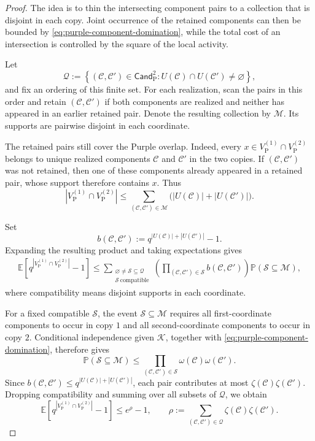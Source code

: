 \documentclass[letterpaper,11pt,reqno]{amsart}
\theoremstyle{definition}
\begin{document}
\begin{proof}
The idea is to thin the intersecting component pairs to a collection that is
disjoint in each copy. Joint occurrence of the retained components can then
be bounded by \eqref{eq:purple-component-domination}, while the total cost of
an intersection is controlled by the square of the local activity.

Let
\[
\mathcal Q:=
\left\{
(\mathcal C,\mathcal C')\in\mathsf{Cand}_{\mathrm P}^2:
U(\mathcal C)\cap U(\mathcal C')\ne\varnothing
\right\},
\]
and fix an ordering of this finite set. For each realization, scan the pairs
in this order and retain \((\mathcal C,\mathcal C')\) if both components are
realized and neither has appeared in an earlier retained pair. Denote the
resulting collection by \(\mathcal M\). Its supports are pairwise disjoint in
each coordinate.

The retained pairs still cover the Purple overlap. Indeed, every
\(x\in V_{\mathrm P}^{(1)}\cap V_{\mathrm P}^{(2)}\) belongs to unique realized
components \(\mathcal C\) and \(\mathcal C'\) in the two copies. If
\((\mathcal C,\mathcal C')\) was not retained, then one of these components
already appeared in a retained pair, whose support therefore contains \(x\).
Thus
\[
|V_{\mathrm P}^{(1)}\cap V_{\mathrm P}^{(2)}|
\le
\sum_{(\mathcal C,\mathcal C')\in\mathcal M}
\bigl(|U(\mathcal C)|+|U(\mathcal C')|\bigr).
\]

Set
\[
b(\mathcal C,\mathcal C')
:=
q^{|U(\mathcal C)|+|U(\mathcal C')|}-1.
\]
Expanding the resulting product and taking expectations gives
\[
\begin{aligned}
\mathbb E\left[
q^{|V_{\mathrm P}^{(1)}\cap V_{\mathrm P}^{(2)}|}-1
\right]
\le
\sum_{\substack{\varnothing\ne\mathcal S\subseteq\mathcal Q\\
                 \mathcal S\ \mathrm{compatible}}}
\left(
\prod_{(\mathcal C,\mathcal C')\in\mathcal S}
b(\mathcal C,\mathcal C')
\right)
\mathbb P(\mathcal S\subseteq\mathcal M),
\end{aligned}
\]
where compatibility means disjoint supports in each coordinate.

For a fixed compatible \(\mathcal S\), the event
\(\mathcal S\subseteq\mathcal M\) requires all first-coordinate components
to occur in copy \(1\) and all second-coordinate components to occur in copy
\(2\). Conditional independence given \(\mathcal K\), together with
\eqref{eq:purple-component-domination}, therefore gives
\[
\mathbb P(\mathcal S\subseteq\mathcal M)
\le
\prod_{(\mathcal C,\mathcal C')\in\mathcal S}
\omega(\mathcal C)\omega(\mathcal C').
\]
Since
$b(\mathcal C,\mathcal C')
\le q^{|U(\mathcal C)|+|U(\mathcal C')|}$,
each pair contributes at most
\(\zeta(\mathcal C)\zeta(\mathcal C')\). Dropping compatibility and summing
over all subsets of \(\mathcal Q\), we obtain
\[
\mathbb E\left[
q^{|V_{\mathrm P}^{(1)}\cap V_{\mathrm P}^{(2)}|}-1
\right]
\le e^\rho-1,
\qquad
\rho:=
\sum_{(\mathcal C,\mathcal C')\in\mathcal Q}
\zeta(\mathcal C)\zeta(\mathcal C').
\]


\end{proof}
\end{document}
